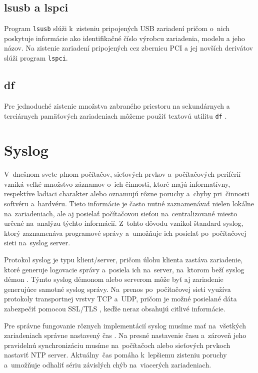\subsection*{lsusb a lspci}
Program \texttt{lsusb} slúži k~zisteniu pripojených USB zariadení pričom o~nich poskytuje informácie ako identifikačné číslo výrobcu zariadenia, modelu a jeho názov. Na zistenie zariadení pripojených cez zbernicu PCI a jej novších derivátov slúži program \texttt{lspci}. \cite{text-utils-book}

\subsection*{df}
Pre jednoduché zistenie množstva zabraného priestoru na sekundárnych a terciárnych pamäťových zariadeniach môžeme použiť textovú utilitu \texttt{df} \cite{performance-monitor-book}.   

\section{Syslog}
V~dnešnom svete plnom počítačov, sieťových prvkov a~počítačových periférií vzniká veľké množstvo záznamov o~ich činnosti, ktoré majú informatívny, respektíve ladiaci charakter alebo oznamujú rôzne poruchy a~chyby pri~činnosti softvéru a~hardvéru. Tieto informácie je často nutné zaznamenávať nielen lokálne na~zariadeniach, ale aj posielať počítačovou sieťou na~centralizované miesto určené na~analýzu týchto informácií. Z~tohto dôvodu vznikol štandard syslog, ktorý zaznamenáva programové správy a~umožňuje ich posielať po~počítačovej sieti na~syslog server.

Protokol syslog je typu klient/server, pričom úlohu klienta zastáva zariadenie, ktoré generuje logovacie správy a~posiela ich na~server, na~ktorom beží syslog démon \cite{pro-admin-book}. Týmto syslog démonom alebo serverom môže byť aj zariadenie generujúce samotné syslog správy. Na~prenos po~počítačovej sieti využíva protokoly transportnej vrstvy TCP a~UDP, pričom je možné posielané dáta zabezpečiť pomocou SSL/TLS \cite{rfc-syslog}, keďže neraz obsahujú citlivé informácie.

Pre správne fungovanie rôznych implementácií syslog musíme mať na~všetkých zariadeniach správne nastavený čas \cite{pro-admin-book}. Na presné nastavenie času a~zároveň jeho pravidelnú synchronizáciu musíme na~počítačoch alebo sieťových prvkoch nastaviť NTP server. \mbox{Aktuálny čas} pomáha k~lepšiemu zisteniu poruchy a~umožňuje odhaliť sériu závislých chýb na~viacerých zariadeniach.

